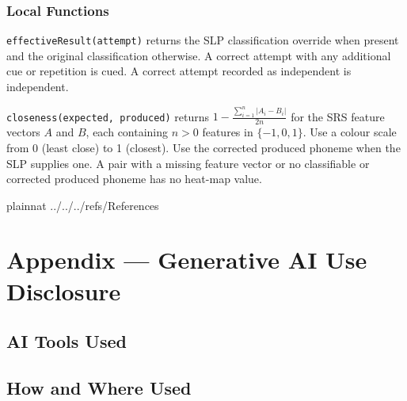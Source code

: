 \documentclass[12pt, titlepage]{article}
\begin{document}
\subsubsection{Local Functions}
\texttt{effectiveResult(attempt)} returns the SLP classification override
when present and the original classification otherwise. A correct attempt
with any additional cue or repetition is cued. A correct attempt recorded as
independent is independent.

\noindent\texttt{closeness(expected, produced)} returns
$1 - \frac{\sum_{i=1}^{n}|A_i-B_i|}{2n}$ for the SRS feature vectors
$A$ and $B$, each containing $n>0$ features in $\{-1,0,1\}$.
Use a colour scale from 0 (least close) to 1 (closest). Use the corrected
produced phoneme when the SLP supplies one. A pair with a missing feature
vector or no classifiable or corrected produced phoneme has no heat-map
value.

 {plainnat}
 {../../../refs/References}

\newpage

\newpage{}

\section{Appendix --- Generative AI Use Disclosure}


\subsection{AI Tools Used}


\subsection{How and Where Used}



\end{document}
